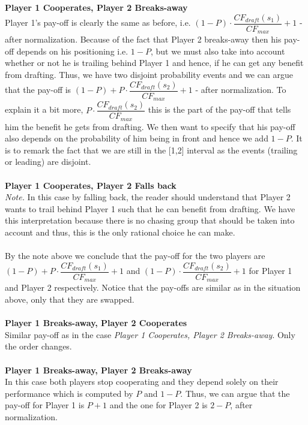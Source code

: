 \documentclass[10pt, a4paper]{report}
\begin{document}
\\\\
\textbf{Player 1 Cooperates, Player 2 Breaks-away}
\\
Player 1's pay-off is clearly the same as before, i.e. $(1-P)\cdot \dfrac{CF_{draft}(s_1)}{CF_{max}} + 1$ - after normalization. Because of the fact that Player 2 breaks-away then his pay-off depends on his positioning i.e. $1-P$, but we must also take into account whether or not he is trailing behind Player 1 and hence, if he can get any benefit from drafting. Thus, we have two disjoint probability events and we can argue that the pay-off is $(1-P) +  P\cdot \dfrac{CF_{draft}(s_2)}{CF_{max}} + 1$ - after normalization. To explain it a bit more, $P\cdot \dfrac{CF_{draft}(s_2)}{CF_{max}}$ this is the part of the pay-off that tells him the benefit he gets from drafting. We then want to specify that his pay-off also depends on the probability of him being in front and hence we add $1-P$. It is to remark the fact that we are still in the [1,2] interval as the events (trailing or leading) are disjoint.
\\\\
\textbf{Player 1 Cooperates, Player 2 Falls back}
\\
\textit{Note.} In this case by falling back, the reader should understand that Player 2 wants to trail behind Player 1 such that he can benefit from drafting. We have this interpretation because there is no chasing group that should be taken into account and thus, this is the only rational choice he can make.
\\\\
By the note above we conclude that the pay-off for the two players are $(1-P) +  P\cdot \dfrac{CF_{draft}(s_1)}{CF_{max}} + 1$ and $(1-P)\cdot \dfrac{CF_{draft}(s_2)}{CF_{max}} + 1$ for Player 1 and Player 2 respectively. Notice that the pay-offs are similar as in the situation above, only that they are swapped.
\\\\
\textbf{Player 1 Breaks-away, Player 2 Cooperates}
\\
Similar pay-off as in the case \textit{Player 1 Cooperates, Player 2 Breaks-away}. Only the order changes.
\\\\
\textbf{Player 1 Breaks-away, Player 2 Breaks-away}
\\
In this case both players stop cooperating and they depend solely on their performance which is computed by $P$ and $1-P$. Thus, we can argue that the pay-off for Player 1 is $P+1$ and the one for Player 2 is $2-P$, after normalization.
\end{document}
